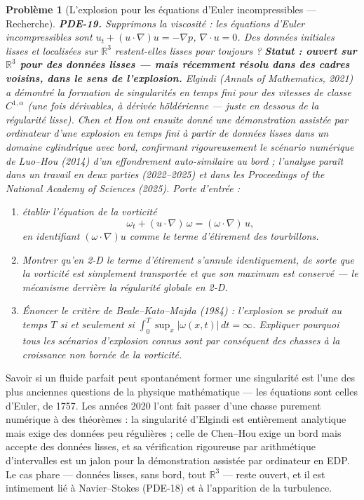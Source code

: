\documentclass[11pt]{article}
\newtheorem{problem}{Problème}
\begin{document}
\bigskip

\begin{problem}[{L'explosion pour les équations d'Euler incompressibles --- Recherche}]
\textbf{PDE-19.} Supprimons la viscosité : les équations d'Euler
incompressibles sont $u_t + (u \cdot \nabla)u = -\nabla p$, $\nabla \cdot u = 0$. Des
données initiales lisses et localisées sur $\mathbb{R}^3$ restent-elles lisses pour toujours ?
\textbf{Statut : ouvert sur $\mathbb{R}^3$ pour des données lisses --- mais récemment résolu dans des
cadres voisins, dans le sens de l'explosion.} Elgindi (Annals of Mathematics,
2021) a démontré la formation de singularités en temps fini pour des vitesses de classe
$C^{1,\alpha}$ (une fois dérivables, à dérivée höldérienne --- juste en dessous de la
régularité lisse). Chen et Hou ont ensuite donné une démonstration assistée par ordinateur d'une
explosion en temps fini à partir de données \textit{lisses} dans un domaine cylindrique avec bord,
confirmant rigoureusement le scénario numérique de Luo--Hou (2014) d'un effondrement auto-similaire
au bord ; l'analyse paraît dans un travail en deux parties (2022--2025) et dans les Proceedings
of the National Academy of Sciences (2025). Porte d'entrée :
\begin{enumerate}
\item[(a)] établir l'équation de la
vorticité
\[ \omega_t + (u \cdot \nabla)\,\omega = (\omega \cdot \nabla)\,u, \]
en identifiant $(\omega \cdot \nabla)u$ comme le terme d'étirement des tourbillons.
\item[(b)] Montrer qu'en
2-D le terme d'étirement s'annule identiquement, de sorte que la vorticité est simplement
transportée et que son maximum est conservé --- le mécanisme derrière la régularité globale en
2-D.
\item[(c)] Énoncer le critère de Beale--Kato--Majda (1984) : l'explosion se produit au temps $T$ si
et seulement si $\int_0^T \sup_x |\omega(x,t)|\,dt = \infty$. Expliquer pourquoi tous les
scénarios d'explosion connus sont par conséquent des chasses à la croissance non bornée de la
vorticité.
\end{enumerate}

\end{problem}

\noindent Savoir si un fluide parfait peut spontanément former une singularité est
l'une des plus anciennes questions de la physique mathématique --- les équations sont celles
d'Euler, de 1757. Les années 2020 l'ont fait passer d'une chasse purement numérique à des
théorèmes : la singularité d'Elgindi est entièrement analytique mais exige des données peu
régulières ; celle de Chen--Hou exige un bord mais accepte des données lisses, et sa vérification
rigoureuse par arithmétique d'intervalles est un jalon pour la démonstration assistée par
ordinateur en EDP. Le cas phare --- données lisses, sans bord, tout $\mathbb{R}^3$ --- reste ouvert,
et il est intimement lié à Navier--Stokes (PDE-18) et à l'apparition de la turbulence.
\end{document}
